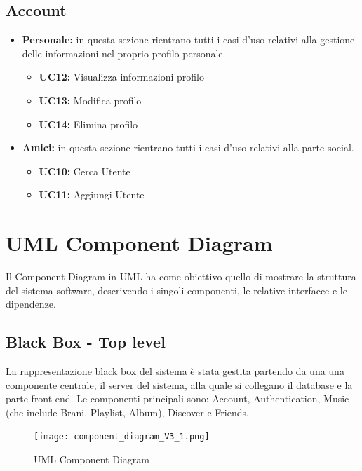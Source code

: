 \subsection{Account}
\begin{itemize}
    \item \textbf{Personale:} in questa sezione rientrano tutti i casi d'uso relativi alla gestione delle informazioni nel proprio profilo personale.
    \begin{itemize}
        \item \textbf{UC12:} Visualizza informazioni profilo 
        \item \textbf{UC13:} Modifica profilo 
        \item \textbf{UC14:} Elimina profilo 
    \end{itemize}
    
    \item \textbf{Amici:} in questa sezione rientrano tutti i casi d'uso relativi alla parte social.
    \begin{itemize}
        \item \textbf{UC10:} Cerca Utente 
        \item \textbf{UC11:} Aggiungi Utente 
    \end{itemize}
\end{itemize}




\newpage
\section{UML Component Diagram}
Il Component Diagram in UML ha come obiettivo quello di mostrare la struttura
del sistema software, descrivendo i singoli componenti, le relative interfacce 
e le dipendenze. 

\vspace{2cm}
\subsection{Black Box - Top level}
La rappresentazione black box del sistema è stata gestita partendo da una
una componente centrale, il server del sistema, alla quale si collegano il database e la parte front-end.
Le componenti principali sono: Account, Authentication, Music (che include Brani, Playlist, Album),
Discover e Friends.
\begin{figure}[H]
    \centering
    \texttt{[image: component\_diagram\_V3\_1.png]}
    \caption{UML Component Diagram}
    \label{fig-uml-component-diag_1}
\end{figure}

